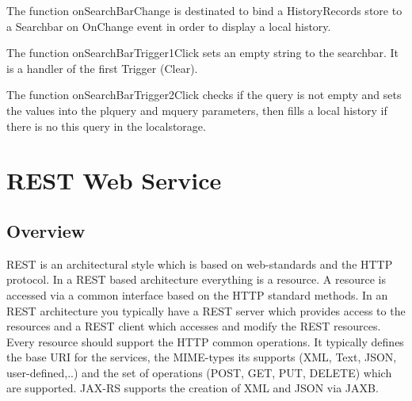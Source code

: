 \par The function onSearchBarChange is destinated to bind a HistoryRecords store to a Searchbar on OnChange event in order to display a local history.\\       
\par The function  onSearchBarTrigger1Click sets an empty string to the searchbar. It is a handler of the first Trigger (Clear). \\

\par The function  onSearchBarTrigger2Click checks if the query is not empty and sets the values into the plquery and mquery parameters, then fills a local history if there is no this query in the localstorage.\\


\chapter{REST Web Service}

\section{Overview}
\par REST is an architectural style which is based on web-standards and the HTTP protocol. In a REST based architecture everything is a resource. A resource is accessed via a common interface based on the HTTP standard methods. In an REST architecture you typically have a REST server which      provides access to the resources and a REST client which accesses and modify the REST resources. Every resource should support the HTTP common operations. It typically defines the base URI for the services, the MIME-types its supports (XML, Text, JSON, user-defined,..) and the set of operations (POST, GET, PUT, DELETE) which are supported. JAX-RS supports the creation of XML and JSON via JAXB.\\        

